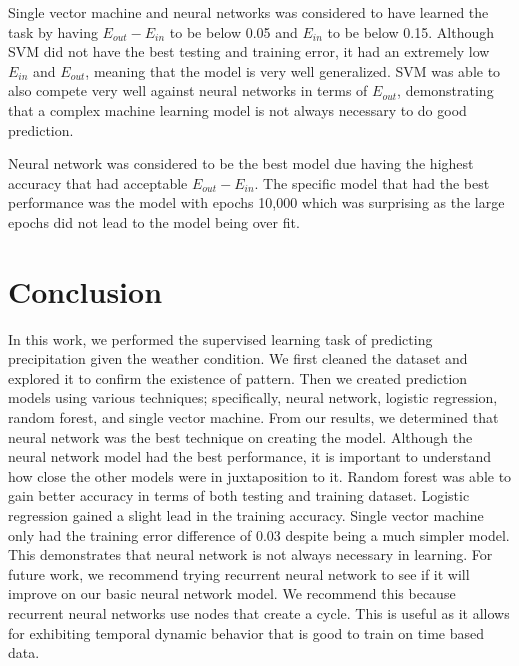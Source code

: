\documentclass[conference]{IEEEtran}
\begin{document}
Single vector machine and neural networks was considered to have learned the task by having $E_{out}-E_{in}$ to be below 0.05 and $E_{in}$ to be below 0.15. Although SVM did not have the best testing and training error, it had an extremely low $E_{in}$ and $E_{out}$, meaning that the model is very well generalized. SVM was able to also compete very well against neural networks in terms of $E_{out}$, demonstrating that a complex machine learning model is not always necessary to do good prediction. 

Neural network was considered to be the best model due having the highest accuracy that had acceptable $E_{out}-E_{in}$. The specific model that had the best performance was the model with epochs 10,000 which was surprising as the large epochs did not lead to the model being over fit.

\section{Conclusion}
In this work, we performed the supervised learning task of predicting precipitation given the weather condition. We first cleaned the dataset and explored it to confirm the existence of pattern. Then we created prediction models using various techniques; specifically, neural network, logistic regression, random forest, and single vector machine. From our results, we determined that neural network was the best technique on creating the model. Although the neural network model had the best performance, it is important to understand how close the other models were in juxtaposition to it. Random forest was able to gain better accuracy in terms of both testing and training dataset. Logistic regression gained a slight lead in the training accuracy. Single vector machine only had the training error difference of 0.03 despite being a much simpler model. This demonstrates that neural network is not always necessary in learning. For future work, we recommend trying recurrent neural network to see if it will improve on our basic neural network model. We recommend this because recurrent neural networks use nodes that create a cycle. This is useful as it allows for exhibiting temporal dynamic behavior that is good to train on time based data.
\end{document}
